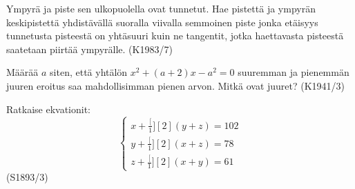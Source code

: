 \begin{tehtava}
Ympyrä ja piste sen ulkopuolella ovat tunnetut. Hae pistettä ja ympyrän keskipistettä yhdistävällä suoralla viivalla semmoinen piste jonka etäisyys tunnetusta pisteestä on yhtäsuuri kuin ne tangentit, jotka haettavasta pisteestä saatetaan piirtää ympyrälle. (K1983/7)
\end{tehtava}

\begin{tehtava}
Määrää $a$ siten, että yhtälön $x^2+(a+2)x-a^2=0$ suuremman ja pienemmän juuren eroitus saa mahdollisimman pienen arvon. Mitkä ovat juuret? (K1941/3)
\end{tehtava}


\begin{tehtava}
Ratkaise ekvationit:
\[
\left\{
\begin{aligned}
 x+\frac[1][2](y+z)=102    \\
 y+\frac[1][2](x+z)=78  \\
 z+\frac[1][2](x+y)=61
\end{aligned}
\right. 
\]
(S1893/3)
\end{tehtava}

